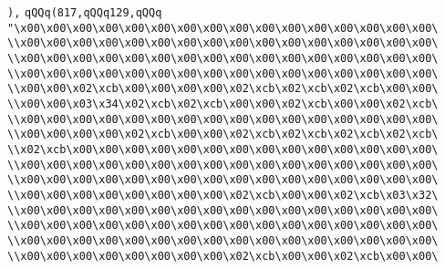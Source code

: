 \verb|),|\newline
\verb|qQQq(817,qQQq129,qQQq|\newline
\verb|"\x00\x00\x00\x00\x00\x00\x00\x00\x00\x00\x00\x00\x00\x00\x00\x00\|\newline
\verb|\\x00\x00\x00\x00\x00\x00\x00\x00\x00\x00\x00\x00\x00\x00\x00\x00\|\newline
\verb|\\x00\x00\x00\x00\x00\x00\x00\x00\x00\x00\x00\x00\x00\x00\x00\x00\|\newline
\verb|\\x00\x00\x00\x00\x00\x00\x00\x00\x00\x00\x00\x00\x00\x00\x00\x00\|\newline
\verb|\\x00\x00\x02\xcb\x00\x00\x00\x00\x02\xcb\x02\xcb\x02\xcb\x00\x00\|\newline
\verb|\\x00\x00\x03\x34\x02\xcb\x02\xcb\x00\x00\x02\xcb\x00\x00\x02\xcb\|\newline
\verb|\\x00\x00\x00\x00\x00\x00\x00\x00\x00\x00\x00\x00\x00\x00\x00\x00\|\newline
\verb|\\x00\x00\x00\x00\x02\xcb\x00\x00\x02\xcb\x02\xcb\x02\xcb\x02\xcb\|\newline
\verb|\\x02\xcb\x00\x00\x00\x00\x00\x00\x00\x00\x00\x00\x00\x00\x00\x00\|\newline
\verb|\\x00\x00\x00\x00\x00\x00\x00\x00\x00\x00\x00\x00\x00\x00\x00\x00\|\newline
\verb|\\x00\x00\x00\x00\x00\x00\x00\x00\x00\x00\x00\x00\x00\x00\x00\x00\|\newline
\verb|\\x00\x00\x00\x00\x00\x00\x00\x00\x02\xcb\x00\x00\x02\xcb\x03\x32\|\newline
\verb|\\x00\x00\x00\x00\x00\x00\x00\x00\x00\x00\x00\x00\x00\x00\x00\x00\|\newline
\verb|\\x00\x00\x00\x00\x00\x00\x00\x00\x00\x00\x00\x00\x00\x00\x00\x00\|\newline
\verb|\\x00\x00\x00\x00\x00\x00\x00\x00\x00\x00\x00\x00\x00\x00\x00\x00\|\newline
\verb|\\x00\x00\x00\x00\x00\x00\x00\x00\x02\xcb\x00\x00\x02\xcb\x00\x00\|\newline
